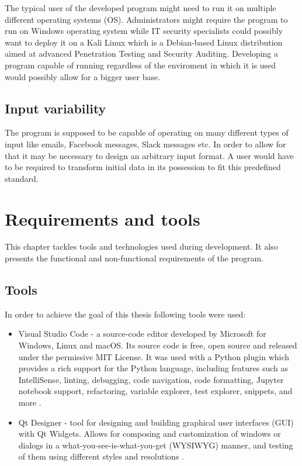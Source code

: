 \documentclass[a4paper,twoside,12pt]{book}
\begin{document}
The typical user of the developed program might need to run it on multiple different operating systems (OS). Administrators might require the program to run
on Windows operating system while IT security specialists could possibly want to deploy it on a Kali Linux which is a Debian-based Linux distribution 
aimed at advanced Penetration Testing and Security Auditing. Developing a program capable of running regardless of the enviroment in which it is used would possibly
allow for a bigger user base.

\section{Input variability}

The program is supposed to be capable of operating on many different types of input like emails, Facebook messages, Slack messages etc. In order to 
allow for that it may be necessary to design an arbitrary input format. A user would have to be required to transform initial data in its possession to 
fit this predefined standard. 

\chapter{Requirements and tools}

This chapter tackles tools and technologies used during development. It also presents the functional and non-functional requirements of the program.

\section{Tools}
In order to achieve the goal of this thesis following tools were used:
\begin{itemize}
   \item Visual Studio Code - a source-code editor developed by Microsoft for Windows, Linux and macOS. Its source code is free, open source and 
   released under the permissive MIT License. It was used with a Python plugin which provides a rich support for the Python language, including 
   features such as IntelliSense, linting, debugging, code navigation, code formatting, Jupyter notebook support, refactoring, variable explorer, 
   test explorer, snippets, and more \cite{bib:internetVSCLicence}\cite{bib:internetVSC}.
   \item Qt Designer - tool for designing and building graphical user interfaces (GUI) with Qt Widgets. Allows for composing and customization 
   of windows or dialogs in a what-you-see-is-what-you-get (WYSIWYG) manner, and testing of them using different styles and resolutions \cite{bib:internetQt}.
\end{itemize} 
\end{document}

